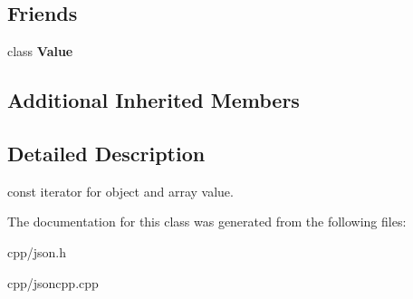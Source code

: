 \subsection*{Friends}
\begin{DoxyCompactItemize}
\item 
\mbox{\label{class_json_1_1_value_const_iterator_aeceedf6e1a7d48a588516ce2b1983d6f}} 
class {\bfseries Value}
\end{DoxyCompactItemize}
\subsection*{Additional Inherited Members}


\subsection{Detailed Description}
const iterator for object and array value. 



The documentation for this class was generated from the following files\+:\begin{DoxyCompactItemize}
\item 
cpp/json.\+h\item 
cpp/jsoncpp.\+cpp\end{DoxyCompactItemize}
